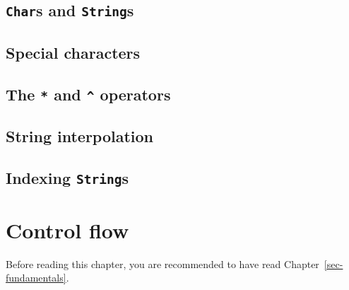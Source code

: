 \documentclass[
  letterpaper,
  DIV=11,
  numbers=noendperiod]{scrreprt}
\begin{document}
\hypertarget{chars-and-strings}{%
\section{\texorpdfstring{\texttt{Char}s and
\texttt{String}s}{Chars and Strings}}\label{chars-and-strings}}

\hypertarget{special-characters}{%
\section{Special characters}\label{special-characters}}

\hypertarget{the-and-operators}{%
\section{\texorpdfstring{The \texttt{*} and \texttt{\^{}}
operators}{The * and \^{} operators}}\label{the-and-operators}}

\hypertarget{string-interpolation}{%
\section{String interpolation}\label{string-interpolation}}

\hypertarget{indexing-strings}{%
\section{\texorpdfstring{Indexing
\texttt{String}s}{Indexing Strings}}\label{indexing-strings}}

\hypertarget{sec-controlflow}{%
\chapter{Control flow}\label{sec-controlflow}}

\begin{tcolorbox}[enhanced jigsaw, toprule=.15mm, opacitybacktitle=0.6, leftrule=.75mm, breakable, coltitle=black, bottomrule=.15mm, colbacktitle=quarto-callout-important-color!10!white, bottomtitle=1mm, rightrule=.15mm, title=\textcolor{quarto-callout-important-color}{\faExclamation}\hspace{0.5em}{Prerequisites}, colframe=quarto-callout-important-color-frame, left=2mm, colback=white, opacityback=0, arc=.35mm, toptitle=1mm, titlerule=0mm]

Before reading this chapter, you are recommended to have read
Chapter~\ref{sec-fundamentals}.

\end{tcolorbox}
\end{document}
